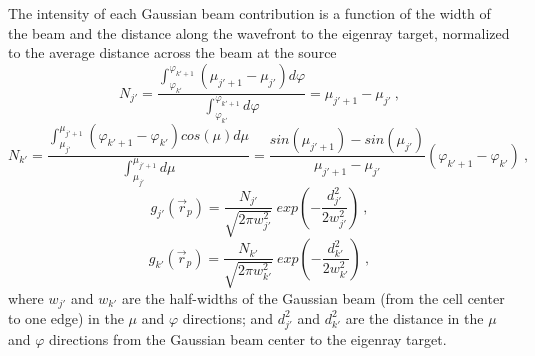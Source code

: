 \documentclass{ws-jca}
\begin{document}
The intensity of each Gaussian beam contribution is a function of the width
of the beam and the distance along the wavefront to the eigenray target,
normalized to the average distance across the beam at the source
\begin{equation}
	N_{j'} = \frac{ \int_{\varphi_{k'}}^{\varphi_{k'+1}} \left( \mu_{j'+1} - \mu_{j'} \right) d\varphi }
		{  \int_{\varphi_{k'}}^{\varphi_{k'+1}} d\varphi }
		= \mu_{j'+1} - \mu_{j'}
	\label{eq:gaussian_norm1} \:,
\end{equation}
\begin{equation}
	 N_{k'}= \frac{ \int_{\mu_{j'}}^{\mu_{j'+1}} \left( \varphi_{k'+1} - \varphi_{k'} \right) cos \left( \mu \right) d\mu }
		{  \int_{\mu_{j'}}^{\mu_{j'+1}} d\mu }
		= \frac{ sin(\mu_{j'+1}) - sin(\mu_{j'}) }{\mu_{j'+1}-\mu_{j'}}
		\left( \varphi_{k'+1} - \varphi_{k'} \right)  \:,
	\label{eq:gaussian_norm2}
\end{equation}
\begin{equation}
	g_{j'}(\vec{r}_p) = \frac{N_{j'}}{\sqrt{2\pi w^2_{j'}}} 
		\: exp \left( - \frac{d^2_{j'}}{2w^2_{j'}} \right) \:,
	\label{eq:gaussian_each1}
\end{equation}
\begin{equation}
	g_{k'}(\vec{r}_p) = \frac{ N_{k'} }{\sqrt{2\pi w^2_{k'}}} 
		\: exp \left( - \frac{d^2_{k'}}{2w^2_{k'}} \right) \:,
	\label{eq:gaussian_each2}
\end{equation}
where
\(w_{j'}\) and \(w_{k'}\) are the half-widths of the Gaussian beam (from the cell
center to one edge) in the \(\mu\) and \(\varphi\) directions; and
\(d^2_{j'}\) and \(d^2_{k'}\) are the distance in the \(\mu\) and \(\varphi\)
directions from the Gaussian beam center to the eigenray target. 
\end{document}
